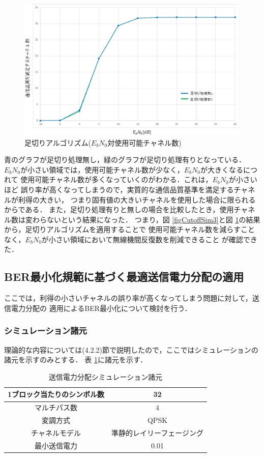 \begin{figure}[t]
    \centering
    \includegraphics[width=0.95\linewidth]{chapter4/figure/CutoffSim4.eps}
    \caption{足切りアルゴリズム($E_bN_0$対使用可能チャネル数)}
    \label{figCutoffSim4}
\end{figure}

青のグラフが足切り処理無し，緑のグラフが足切り処理有りとなっている．
$E_bN_0$が小さい領域では，使用可能チャネル数が少なく，$E_bN_0$が大きくなるにつれて
使用可能チャネル数が多くなっていくのがわかる．これは，$E_bN_0$が小さいほど
誤り率が高くなってしまうので，実質的な通信品質基準を満足するチャネルが利得の大きい，
つまり固有値の大きいチャネルを使用した場合に限られるからである．
また，足切り処理有りと無しの場合を比較したとき，使用チャネル数は変わらないという結果になった．
つまり，図 \ref{figCutoffSim3}と図 \ref{figCutoffSim4}の結果から，足切りアルゴリズムを適用することで
使用可能チャネル数を減らすことなく，$E_bN_0$が小さい領域において無線機間反復数を削減できること
が確認できた．

\subsection{BER最小化規範に基づく最適送信電力分配の適用}
ここでは，利得の小さいチャネルの誤り率が高くなってしまう問題に対して，送信電力分配の
適用によるBER最小化について検討を行う．

\subsubsection{シミュレーション諸元}
理論的な内容については(4.2.2)節で説明したので，ここではシミュレーションの諸元を示すのみとする．
表 \ref{tabPcon1}に諸元を示す．

\begin{table}[t]
    \begin{tabular}{|c|c|} \hline
        1ブロック当たりのシンボル数 & 32 \\ \hline
        マルチパス数 & 4 \\ \hline
        変調方式 & QPSK \\ \hline
        チャネルモデル & 準静的レイリーフェージング \\ \hline
        最小送信電力 & 0.01 \\ \hline
    \end{tabular}
    \centering
    \caption{送信電力分配シミュレーション諸元}
    \label{tabPcon1}
\end{table}

